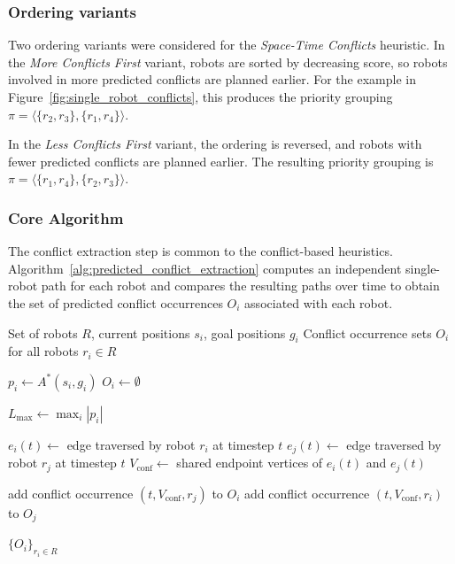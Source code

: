 \subsubsection{Ordering variants}
\label{subsubsec:space_time_conflicts_ordering_variants}
\hspace{\parindent}
Two ordering variants were considered for the \textit{Space-Time Conflicts} heuristic. In the \textit{More Conflicts First} variant, robots are sorted by decreasing score, so robots involved in more predicted conflicts are planned earlier. For the example in Figure~\ref{fig:single_robot_conflicts}, this produces the priority grouping \(\pi = \langle \{r_2, r_3\}, \{r_1, r_4\} \rangle\).

In the \textit{Less Conflicts First} variant, the ordering is reversed, and robots with fewer predicted conflicts are planned earlier. The resulting priority grouping is \(\pi = \langle \{r_1, r_4\}, \{r_2, r_3\} \rangle\).

\subsubsection{Core Algorithm}
\label{subsubsec:space_time_conflicts_pseudocode}
\hspace{\parindent}
The conflict extraction step is common to the conflict-based heuristics. Algorithm~\ref{alg:predicted_conflict_extraction}
computes an independent single-robot path for each robot and compares the resulting paths over time
to obtain the set of predicted conflict occurrences \(O_i\) associated with each robot.

\begin{algorithm}[H]
\caption{Predicted Conflict Extraction}
\label{alg:predicted_conflict_extraction}
\begin{algorithmic}[1]
\Require Set of robots \(R\), current positions \(s_i\), goal positions \(g_i\)
\Ensure Conflict occurrence sets \(O_i\) for all robots \(r_i \in R\)

    \State \(p_i \gets A^*(s_i, g_i)\) 
    \State \(O_i \gets \emptyset\) 
\EndFor

\State \(L_{\max} \gets \max_i |p_i|\)

            \State \(e_i(t) \gets\) edge traversed by robot \(r_i\) at timestep \(t\)
            \State \(e_j(t) \gets\) edge traversed by robot \(r_j\) at timestep \(t\)
            \State \(V_{\mathrm{conf}} \gets\) shared endpoint vertices of \(e_i(t)\) and \(e_j(t)\)

                \State add conflict occurrence \((t,V_{\mathrm{conf}},r_j)\) to \(O_i\)
                \State add conflict occurrence \((t,V_{\mathrm{conf}},r_i)\) to \(O_j\)
            \EndIf
        \EndIf
    \EndFor
\EndFor

\State \Return \(\{O_i\}_{r_i \in R}\)
\end{algorithmic}
\end{algorithm}


